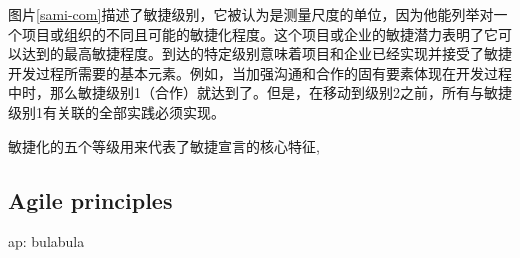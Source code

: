\documentclass[twocolumn]{svjour3}[]
\begin{document}
图片\ref{sami-com}描述了敏捷级别，它被认为是测量尺度的单位，因为他能列举对一个项目或组织的不同且可能的敏捷化程度。这个项目或企业的敏捷潜力表明了它可以达到的最高敏捷程度。到达的特定级别意味着项目和企业已经实现并接受了敏捷开发过程所需要的基本元素。例如，当加强沟通和合作的固有要素体现在开发过程中时，那么敏捷级别1（合作）就达到了。但是，在移动到级别2之前，所有与敏捷级别1有关联的全部实践必须实现。

敏捷化的五个等级用来代表了敏捷宣言的核心特征\cite{agilemanifestoo2001agile},

\subsection{Agile principles}
\label{ap}

ap: bulabula



\end{document}
